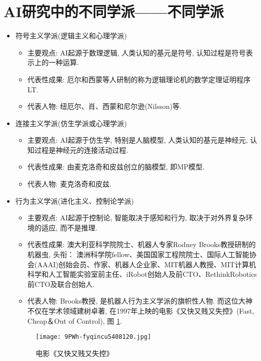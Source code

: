 \section{AI研究中的不同学派——不同学派}
\begin{itemize}
\item 符号主义学派(逻辑主义和心理学派)
     \begin{itemize}
       \item 主要观点: AI起源于数理逻辑, 人类认知的基元是符号, 认知过程是符号表示上的一种运算.
       \item 代表性成果: 厄尔和西蒙等人研制的称为逻辑理论机的数学定理证明程序LT.
       \item 代表人物: 纽厄尔、肖、西蒙和尼尔逊(Nilsson)等.
    \end{itemize}
\item 连接主义学派(仿生学派或心理学派)
     \begin{itemize}
       \item 主要观点: AI起源于仿生学, 特别是人脑模型, 人类认知的基元是神经元, 认知过程是神经元的连接活动过程.
      \item 代表性成果: 由麦克洛奇和皮兹创立的脑模型, 即MP模型.
      \item 代表人物: 麦克洛奇和皮兹.
    \end{itemize}
\item 行为主义学派(进化主义、控制论学派)
     \begin{itemize}
        \item 主要观点: AI起源于控制论, 智能取决于感知和行为, 取决于对外界复杂环境的适应, 而不是推理.
        \item 代表性成果: 澳大利亚科学院院士、机器人专家Rodney Brooks教授研制的机器虫,  头衔： 澳洲科学院fellow、美国国家工程院院士、国际人工智能协会(AAAI)创始会员、作家、机器人企业家、MIT机器人教授、MIT计算机科学和人工智能实验室前主任、iRobot创始人及前CTO、RethinkRobotics前CTO及联合创始人.
        \item 代表人物:  Brooks教授,  是机器人行为主义学派的旗帜性人物. 而这位大神不仅在学术领域建树卓著, 在1997年上映的电影《又快又贱又失控》(Fast,  Cheap＆Out of Control),  图 \ref{AI:fyqincu540Fig2}.
    \end{itemize}
\begin{figure}[htbp]
	\centering
	\texttt{[image: 9PWh-fyqincu5408120.jpg]}
	\caption{电影《又快又贱又失控》}
   \label{AI:fyqincu540Fig2}
\end{figure}

\end{itemize}
